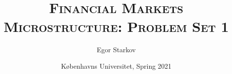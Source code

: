 \documentclass[11pt
]{exam}
\begin{document}
\title{\textsc{Financial Markets Microstructure: Problem Set 1}}
\date{K{\o}benhavns Universitet, Spring 2021}
\author{Egor Starkov}


\maketitle





%
%
%
\end{document}
